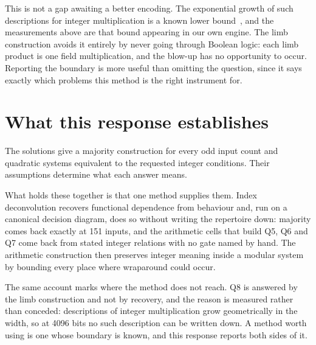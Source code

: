 \documentclass[11pt,a4paper]{article}
\begin{document}
This is not a gap awaiting a better encoding. The exponential growth of such
descriptions for integer multiplication is a known lower bound~\cite{bryant},
and the measurements above are that bound appearing in our own engine. The limb
construction avoids it entirely by never going through Boolean logic: each limb
product is one field multiplication, and the blow-up has no opportunity to
occur. Reporting the boundary is more useful than omitting the question, since
it says exactly which problems this method is the right instrument for.
\FloatBarrier

\section{What this response establishes}
The solutions give a majority construction for every odd input count and
quadratic systems equivalent to the requested integer conditions. Their
assumptions determine what each answer means.

What holds these together is that one method supplies them. Index
deconvolution recovers functional dependence from behaviour and, run on a
canonical decision diagram, does so without writing the repertoire down:
majority comes back exactly at 151 inputs, and the arithmetic cells that build
Q5, Q6 and Q7 come back from stated integer relations with no gate named by
hand. The arithmetic construction then preserves integer meaning inside a
modular system by bounding every place where wraparound could occur.

The same account marks where the method does not reach. Q8 is answered by the
limb construction and not by recovery, and the reason is measured rather than
conceded: descriptions of integer multiplication grow geometrically in the
width, so at 4096 bits no such description can be written down. A method worth
using is one whose boundary is known, and this response reports both sides of
it.
\end{document}
